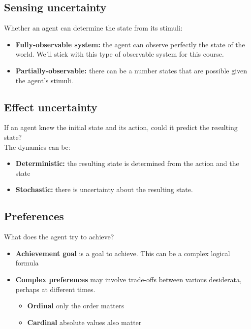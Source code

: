 \documentclass[12pt]{article}
\begin{document}
\subsection*{Sensing uncertainty}
Whether an agent can determine the state from its stimuli:

\begin{itemize}
    \item \textbf{Fully-observable system:} the agent can observe perfectly the state of the world. We'll stick with this type of observable system for this course.    
    \item \textbf{Partially-observable:} there can be a number states that are possible given the agent’s
stimuli.
\end{itemize}

\subsection*{Effect uncertainty}
If an agent knew the initial state and its action, could it predict the resulting state?\\

\noindent The dynamics can be:

\begin{itemize}
    \item \textbf{Deterministic:} the resulting state is determined from the action and the state
    \item \textbf{Stochastic:} there is uncertainty about the resulting state.
\end{itemize}

\subsection*{Preferences}
What does the agent try to achieve?

\begin{itemize}
    \item \textbf{Achievement goal} is a goal to achieve. This can be a complex logical formula
    \item \textbf{Complex preferences} may involve trade-offs between various desiderata, perhaps at
different times.
    \begin{itemize}
        \item \textbf{Ordinal} only the order matters
        \item \textbf{Cardinal} absolute values also matter
    \end{itemize}
\end{itemize}
\end{document}
